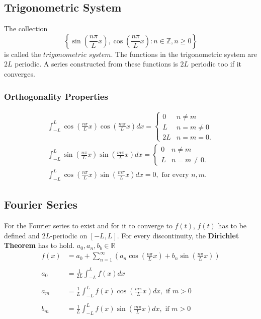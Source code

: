 \subsection{Trigonometric System}
The collection
\begin{equation*}
    \left\{\sin\left(\frac{n\pi}Lx\right),\cos\left(\frac{n\pi}Lx\right):n\in\mathbb{Z},n\geq0\right\}
\end{equation*}
is called the $trigonometric$ $system$. The functions in the trigonometric system are $2L$ periodic. A series constructed from these functions is $2L$ periodic too if it converges.
\subsubsection{Orthogonality Properties}
\begin{align*}
    \int_{-L}^L\cos\left(\frac{n\pi}Lx\right)\cos\left(\frac{m\pi}Lx\right)dx=\begin{cases}0&n\neq m\\L&n=m\neq0\\2L&n=m=0.\end{cases} \\
    \int_{-L}^L\sin\left(\frac{n\pi}Lx\right)\sin\left(\frac{m\pi}Lx\right)dx=\begin{cases}0&n\neq m\\L&n=m\neq0.\end{cases}           \\
    \int_{-L}^L\cos\left(\frac{n\pi}Lx\right)\sin\left(\frac{m\pi}Lx\right)dx=0,\text{ for every }n,m.
\end{align*}
\subsection{Fourier Series}
For the Fourier series to exist and for it to converge to $f(t)$, $f(t)$ has to be defined and $2L$-periodic on $[-L,L]$.
For every discontinuity, the \textbf{Dirichlet Theorem} has to hold. $a_0,a_n,b_b\in \mathbb{R}$
\begin{align*}
    f(x)  & =a_0+\sum_{n=1}^\infty\left(a_n\cos\left(\frac{n\pi}Lx\right)+b_n\sin\left(\frac{n\pi}Lx\right)\right) \\ \\
    a_{0} & =\frac{1}{2L}\int_{-L}^{L}f(x)dx                                                                       \\ \\
    a_{m} & =\frac{1}{L}\int_{-L}^{L}f(x)\cos\left(\frac{m\pi}{L}x\right)dx,\text{ if }m>0                         \\ \\
    b_{m} & =\frac{1}{L}\int_{-L}^{L}f(x)\sin\left(\frac{m\pi}{L}x\right)dx,\text{ if }m>0
\end{align*}
